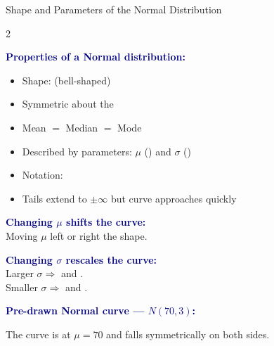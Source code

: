 \documentclass[10pt]{article}
\begin{document}
\vspace{0.08in}

\boxguard
\begin{notesbox}{Shape and Parameters of the Normal Distribution}
\small
\begin{multicols}{2}

\textbf{\textcolor{navy}{Properties of a Normal distribution:}}
\begin{itemize}[itemsep=3pt]
  \item Shape:  (bell-shaped)
  \item Symmetric about the 
  \item Mean $=$ Median $=$ Mode
  \item Described by  parameters:
        $\mu$ () and $\sigma$ ()
  \item Notation: 
  \item Tails extend to $\pm\infty$ but curve
        approaches  quickly
\end{itemize}

\vspace{6pt}
\textbf{\textcolor{navy}{Changing $\mu$ shifts the curve:}}\\
Moving $\mu$ left or right  the shape.

\vspace{4pt}
\textbf{\textcolor{navy}{Changing $\sigma$ rescales the curve:}}\\
Larger $\sigma \Rightarrow$  and .\\
Smaller $\sigma \Rightarrow$  and .

\columnbreak

\textbf{\textcolor{navy}{Pre-drawn Normal curve — $N(70, 3)$:}}

\vspace{4pt}
\begin{center}
\end{center}

\vspace{4pt}
\small The curve is  at $\mu = 70$
and falls symmetrically on both sides.

\end{multicols}
\end{notesbox}
\end{document}
